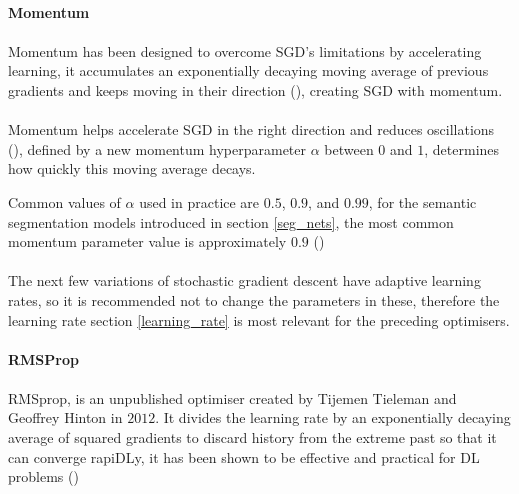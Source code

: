 \paragraph{Momentum}
\paragraph{}
Momentum has been designed to overcome \gls{SGD}'s limitations by accelerating learning, it accumulates an exponentially decaying moving average of previous gradients and keeps moving in their direction (\cite{GoodBengCour16}), creating \gls{SGD} with momentum. 

\paragraph{}
Momentum helps accelerate \gls{SGD} in the right direction and reduces oscillations (\cite{ruder2017overview}), defined by a new momentum hyperparameter $\alpha$ between $0$ and $1$, determines how quickly this moving average decays.

Common values of $\alpha$ used in practice are $0.5$, $0.9$, and $0.99$, for the semantic segmentation models introduced in section \ref{seg_nets}, the most common momentum parameter value is approximately $0.9$ (\cite{sultana2020106062})


\paragraph{}
The next few variations of stochastic gradient descent have adaptive learning rates, so it is recommended not to change the parameters in these, therefore the learning rate section \ref{learning_rate} is most relevant for the preceding optimisers.

\paragraph{RMSProp}
\paragraph{}
RMSprop, is an unpublished optimiser created by Tijemen Tieleman and Geoffrey Hinton in $2012$. It divides the learning rate by an exponentially decaying average of squared gradients to discard history from the extreme past so that it can converge rapi\gls{DL}y, it has been shown to be effective and practical for \gls{DL} problems (\cite{GoodBengCour16})

